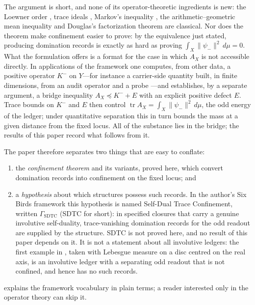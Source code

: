 \documentclass[11pt]{article}
\DeclareMathOperator{\trace}{tr}
\newcommand{\psim}{\psi_{-}}
\newcommand{\AX}{A_{X}}
\newcommand{\Kminus}{K^{-}}
\newcommand{\GamSDTC}{\Gamma_{\mathrm{SDTC}}}
\theoremstyle{definition}
\begin{document}
The argument is short, and none of its operator-theoretic ingredients
is new: the Loewner order \citep{Loewner1934,Bhatia1997}, trace
ideals \citep{Simon2005}, Markov's inequality \citep{Folland1999},
the arithmetic--geometric mean inequality
\citep{HardyLittlewoodPolya1952} and Douglas's factorization theorem
\citep{Douglas1966} are classical.  Nor does the theorem make
confinement easier to prove: by the equivalence just stated, producing
domination records is exactly as hard as proving
\(\int_X\|\psim\|^2\,d\mu=0\).  What the formulation offers is a
format for the case in which \(\AX\) is not accessible directly.  In
applications of the framework one computes, from other data, a
positive operator \(\Kminus\) on \(Y\)---for instance a carrier-side
quantity built, in finite dimensions, from an audit operator and a
probe \citep{TsiokosNeedleKiller2026}---and establishes, by a separate
argument, a bridge inequality \(\AX\preceq\Kminus+E\) with an explicit
positive defect \(E\).  Trace bounds on \(\Kminus\) and \(E\) then
control \(\trace\AX=\int_X\|\psim\|^2\,d\mu\), the odd energy of the
ledger; under quantitative separation this in turn bounds the mass at
a given distance from the fixed locus.
All of the substance lies in the bridge; the results of this paper
record what follows from it.

The paper therefore separates two things that are easy to conflate:
\begin{enumerate}
  \item the \emph{confinement theorem} and its variants, proved here,
    which convert domination records into confinement on the fixed
    locus; and
  \item a \emph{hypothesis} about which structures possess such
    records.  In the author's Six Birds framework
    \citep{TsiokosFoundationsI2026} this hypothesis is named
    Self-Dual Trace Confinement, written \(\GamSDTC\) (SDTC for
    short): in specified closures that carry a genuine involutive
    self-duality, trace-vanishing domination records for the odd
    readout are supplied by the structure.  SDTC is not proved here,
    and no result of this paper depends on it.  It is not a
    statement about all involutive ledgers: the first example in
    , taken with Lebesgue measure on a
    disc centred on the real axis, is an involutive ledger with a
    separating odd readout that is not confined, and hence has no
    such records.
\end{enumerate}
 explains the framework vocabulary in plain
terms; a reader interested only in the operator theory can skip it.
\end{document}
